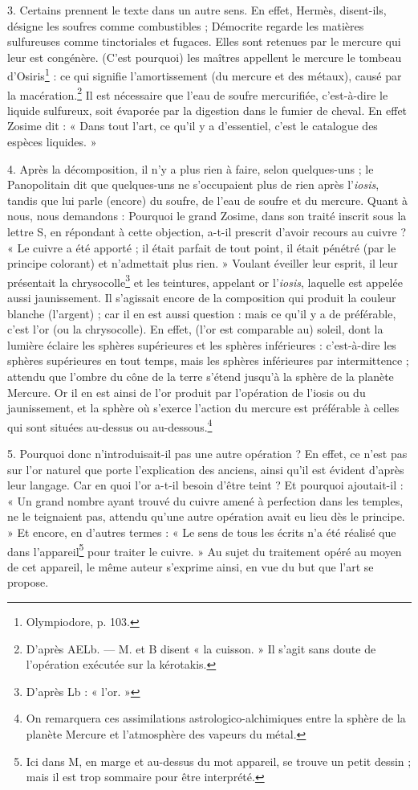 \documentclass[a4paper, 11pt, oneside, polutonikogreek, french]{article}
\begin{document}
3. Certains prennent le texte dans un autre sens. En effet, Hermès, disent-ils, désigne les soufres comme combustibles ; Démocrite regarde les matières sulfureuses comme tinctoriales et fugaces. Elles sont retenues par le mercure qui leur est congénère. (C'est pourquoi) les maîtres appellent le mercure le tombeau d'Osiris\footnote{Olympiodore, p. 103.} : ce qui signifie l'amortissement (du mercure et des métaux), causé par la macération.\footnote{D'après AELb. --- M. et B disent « la cuisson. » Il s'agit sans doute de l'opération exécutée sur la kérotakis.} Il est nécessaire que l'eau de soufre mercurifiée, c'est-à-dire le liquide sulfureux, soit évaporée par la digestion dans le fumier de cheval. En effet Zosime dit : « Dans tout l'art, ce qu'il y a d'essentiel, c'est le catalogue des espèces liquides. »

4. Après la décomposition, il n'y a plus rien à faire, selon quelques-uns ; le Panopolitain dit que quelques-uns ne s'occupaient plus de rien après l'\emph{iosis}, tandis que lui parle (encore) du soufre, de l'eau de soufre et du mercure. Quant à nous, nous demandons : Pourquoi le grand Zosime, dans son traité inscrit sous la lettre S, en répondant à cette objection, a-t-il prescrit d'avoir recours au cuivre ? « Le cuivre a été apporté ; il était parfait de tout point, il était pénétré (par le principe colorant) et n'admettait plus rien. » Voulant éveiller leur esprit, il leur présentait la chrysocolle\footnote{D'après Lb : « l'or. »} et les teintures, appelant or l'\emph{iosis}, laquelle est appelée aussi jaunissement. Il s'agissait encore de la composition qui produit la couleur blanche (l'argent) ; car il en est aussi question : mais ce qu'il y a de préférable, c'est l'or (ou la chrysocolle). En effet, (l'or est comparable au) soleil, dont la lumière éclaire les sphères supérieures et les sphères inférieures : c'est-à-dire les sphères supérieures en tout temps, mais les sphères inférieures par intermittence ; attendu que l'ombre du cône de la terre s'étend jusqu'à la sphère de la planète Mercure. Or il en est ainsi de l'or produit par l'opération de l'iosis ou du jaunissement, et la sphère où s'exerce l'action du mercure est préférable à celles qui sont situées au-dessus ou au-dessous.\footnote{On remarquera ces assimilations astrologico-alchimiques entre la sphère de la planète Mercure et l'atmosphère des vapeurs du métal.}

5. Pourquoi donc n'introduisait-il pas une autre opération ? En effet, ce n'est pas sur l'or naturel que porte l'explication des anciens, ainsi qu'il est évident d'après leur langage. Car en quoi l'or a-t-il besoin d'être teint ? Et pourquoi ajoutait-il : « Un grand nombre ayant trouvé du cuivre amené à perfection dans les temples, ne le teignaient pas, attendu qu'une autre opération avait eu lieu dès le principe. » Et encore, en d'autres termes : « Le sens de tous les écrits n'a été réalisé que dans l'appareil\footnote{Ici dans M, en marge et au-dessus du mot appareil, se trouve un petit dessin ; mais il est trop sommaire pour être interprété.} pour traiter le cuivre. » Au sujet du traitement opéré au moyen de cet appareil, le même auteur s'exprime ainsi, en vue du but que l'art se propose.
\end{document}
